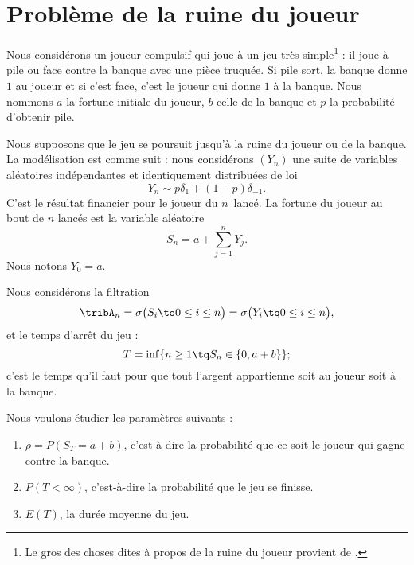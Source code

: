 \section{Problème de la ruine du joueur}
\label{SecMSOjfgM}

Nous considérons un joueur compulsif qui joue à un jeu très simple\footnote{Le gros des choses dites à propos de la ruine du joueur provient de \cite{KXjFWKA}.} : il joue à pile ou face contre la banque avec une pièce truquée. Si pile sort, la banque donne \( 1\) au joueur et si c'est face, c'est le joueur qui donne \( 1\) à la banque. Nous nommons \( a\) la fortune initiale du joueur,  \( b\) celle de la banque et \( p\) la probabilité d'obtenir pile.

Nous supposons que le jeu se poursuit jusqu'à la ruine du joueur ou de la banque. La modélisation est comme suit : nous considérons \( (Y_n)\) une suite de variables aléatoires indépendantes et identiquement distribuées de loi
\begin{equation}
	Y_n\sim p\delta_1+(1-p)\delta_{-1}.
\end{equation}
C'est le résultat financier pour le joueur du \( n\)\ieme\ lancé. La fortune du joueur au bout de \( n\) lancés est la variable aléatoire
\begin{equation}
	S_n=a+\sum_{j=1}^nY_j.
\end{equation}
Nous notons \( Y_0=a\).

Nous considérons la filtration
\begin{equation}
	\tribA_n=\sigma\big( S_i\tq 0\leq i\leq n \big)=\sigma\big( Y_i\tq 0\leq i\leq n \big),
\end{equation}
et le temps d'arrêt du jeu :
\begin{equation}
	T=\inf\{ n\geq 1\tq S_n\in\{ 0,a+b \} \};
\end{equation}
c'est le temps qu'il faut pour que tout l'argent appartienne soit au joueur soit à la banque.

Nous voulons étudier les paramètres suivants :
\begin{enumerate}
	\item
	      \( \rho=P(S_T=a+b)\), c'est-à-dire la probabilité que ce soit le joueur qui gagne contre la banque.
	\item
	      \( P(T<\infty)\), c'est-à-dire la probabilité que le jeu se finisse.
	\item
	      \( E(T)\), la durée moyenne du jeu.
\end{enumerate}

